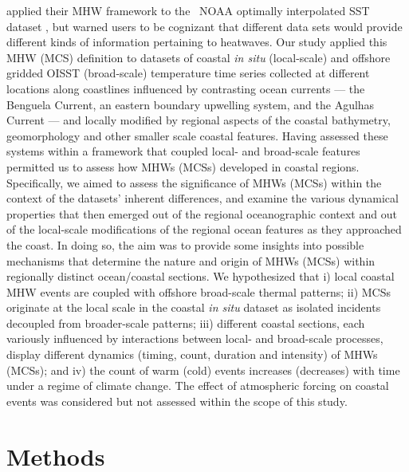 \documentclass[a4paper,10pt,review]{elsarticle}
\begin{document}
\citet{Hobday2016} applied their MHW framework to the \degree~NOAA optimally interpolated SST dataset \citep[hereafter referred to as OISST;][]{Reynolds2007}, but warned users to be cognizant that different data sets would provide different kinds of information pertaining to heatwaves. Our study applied this MHW (MCS) definition to datasets of coastal \emph{in situ} (local-scale) and offshore gridded OISST (broad-scale) temperature time series collected at different locations along coastlines influenced by contrasting ocean currents --- the Benguela Current, an eastern boundary upwelling system, and the Agulhas Current --- and locally modified by regional aspects of the coastal bathymetry, geomorphology and other smaller scale coastal features. Having assessed these systems within a framework that coupled local- and broad-scale features permitted us to assess how MHWs (MCSs) developed in coastal regions. Specifically, we aimed to assess the significance of MHWs (MCSs) within the context of the datasets’ inherent differences, and examine the various dynamical properties that then emerged out of the regional oceanographic context and out of the local-scale modifications of the regional ocean features as they approached the coast. In doing so, the aim was to provide some insights into possible mechanisms that determine the nature and origin of MHWs (MCSs) within regionally distinct ocean/coastal sections. We hypothesized that i) local coastal MHW events are coupled with offshore broad-scale thermal patterns; ii) MCSs originate at the local scale in the coastal \emph{in situ} dataset as isolated incidents decoupled from broader-scale patterns; iii) different coastal sections, each variously influenced by interactions between local- and broad-scale processes, display different dynamics (timing, count, duration and intensity) of MHWs (MCSs); and iv) the count of warm (cold) events increases (decreases) with time under a regime of climate change. The effect of atmospheric forcing on coastal events was considered but not assessed within the scope of this study.

\section{Methods}
\end{document}
